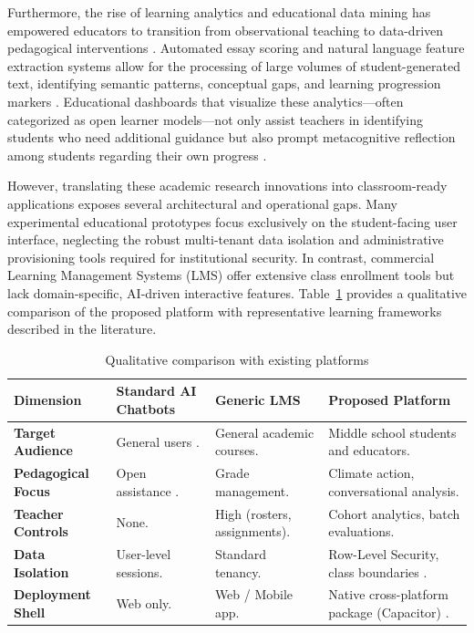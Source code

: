 \documentclass[12pt,a4paper,oneside]{report}
\begin{document}
    Furthermore, the rise of learning analytics and educational data mining has empowered educators to transition from observational teaching to data-driven pedagogical interventions \cite{kotsiantis2012}. Automated essay scoring and natural language feature extraction systems allow for the processing of large volumes of student-generated text, identifying semantic patterns, conceptual gaps, and learning progression markers \cite{attali2006, gasevic2015}. Educational dashboards that visualize these analytics—often categorized as open learner models—not only assist teachers in identifying students who need additional guidance but also prompt metacognitive reflection among students regarding their own progress \cite{bull2016}.

    However, translating these academic research innovations into classroom-ready applications exposes several architectural and operational gaps. Many experimental educational prototypes focus exclusively on the student-facing user interface, neglecting the robust multi-tenant data isolation and administrative provisioning tools required for institutional security. In contrast, commercial Learning Management Systems (LMS) offer extensive class enrollment tools but lack domain-specific, AI-driven interactive features. Table~\ref{tab:comparison} provides a qualitative comparison of the proposed platform with representative learning frameworks described in the literature.

    \begin{table}[H]
        \centering
        \caption{Qualitative comparison with existing platforms}
        \label{tab:comparison}
        \small
        \begin{tabular}{@{}lp{3.2cm}p{3.2cm}p{4cm}@{}}
            \toprule
            \textbf{Dimension} & \textbf{Standard AI Chatbots} & \textbf{Generic LMS} & \textbf{Proposed Platform} \\
            \midrule
            \textbf{Target Audience} & General users \cite{wollny2021}. & General academic courses. & Middle school students and educators. \\
            \textbf{Pedagogical Focus} & Open assistance \cite{vanlehn2011}. & Grade management. & Climate action, conversational analysis. \\
            \textbf{Teacher Controls} & None. & High (rosters, assignments). & Cohort analytics, batch evaluations. \\
            \textbf{Data Isolation} & User-level sessions. & Standard tenancy. & Row-Level Security, class boundaries \cite{postgresqlRLS, supabaseRLS}. \\
            \textbf{Deployment Shell} & Web only. & Web / Mobile app. & Native cross-platform package (Capacitor) \cite{traxler2009}. \\
            \bottomrule
        \end{tabular}
    \end{table}
\end{document}
